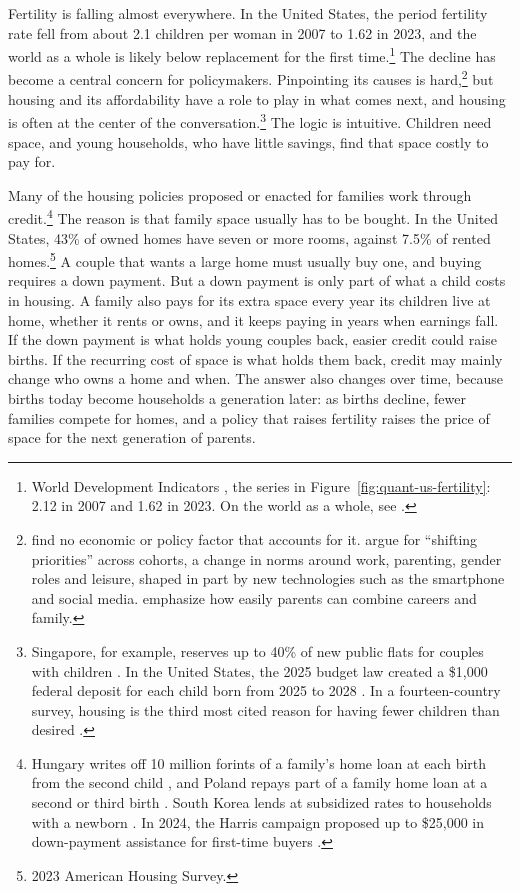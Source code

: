 

Fertility is falling almost everywhere. In the United States, the period
fertility rate fell from about 2.1 children per woman in 2007 to 1.62 in
2023, and the world as a whole is likely below replacement for the first
time.\footnote{World Development Indicators \citep{worldBankWDI}, the
series in Figure~\ref{fig:quant-us-fertility}: 2.12 in 2007 and 1.62 in 2023.
On the world as a whole, see
\citet{fernandezVillaverdeNorrickTerraIncognita2026}.} The decline has become
a central concern for policymakers. Pinpointing its causes is
hard,\footnote{\citet{kearneyPuzzleFallingUS2022} find no economic or policy
factor that accounts for it. \citet{kearneyLevineWhyFertilityLow2025} argue
for ``shifting priorities'' across cohorts, a change in norms around work,
parenting, gender roles and leisure, shaped in part by new technologies such
as the smartphone and social media. \citet{doepkeEconomicsFertilityNew2023}
emphasize how easily parents can combine careers and family.} but housing and
its affordability have a role to play in what comes next, and housing is
often at the center of the conversation.\footnote{Singapore, for example, reserves up to 40\% of new
public flats for couples with children \citep{singaporeFPPS}. In the United
States, the 2025 budget law created a \$1,000 federal deposit for each child
born from 2025 to 2028 \citep{publicLaw119-21}. In a fourteen-country survey,
housing is the third most cited reason for having fewer children than
desired \citep{unfpaSWP2025}.} The logic is intuitive. Children need space,
and young households, who have little savings, find that space costly to pay
for.

Many of the housing policies proposed or enacted for families work through
credit.\footnote{Hungary writes off 10 million forints of a family's home loan
at each birth from the second child \citep{hungaryCSOKPlus}, and Poland
repays part of a family home loan at a second or third birth
\citep{polandFamilyRepayment}. South Korea lends at subsidized rates to
households with a newborn \citep{koreaNewbornLoan}. In 2024, the Harris
campaign proposed up to \$25,000 in down-payment assistance for first-time
buyers \citep{harrisCampaign2024}.} The reason is that family space usually has to be
bought. In the United States, 43\% of owned homes have seven or more rooms,
against 7.5\% of rented homes.\footnote{2023 American Housing Survey.} A
couple that wants a large home must usually buy one, and buying requires a
down payment. But a down payment is only part of what a child
costs in housing. A family also pays for its extra space every year its
children live at home, whether it rents or owns, and it keeps paying in years
when earnings fall. If the down payment is what holds young couples back,
easier credit could raise births. If the recurring cost of space is what
holds them back, credit may mainly change who owns a home and when. The
answer also changes over time, because births today become households a
generation later: as births decline, fewer families compete for homes, and a
policy that raises fertility raises the price of space for the next
generation of parents.


